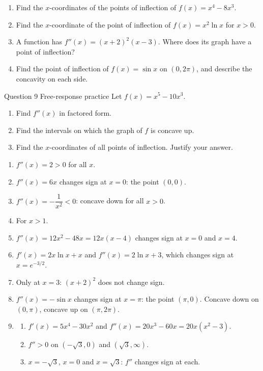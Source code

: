 \documentclass[11pt]{article}
\begin{document}
\begin{enumerate}[leftmargin=*,itemsep=2pt,start=5]
  \item Find the $x$-coordinates of the points of inflection of $f(x)=x^4-8x^3$.\work{2.8cm}
  \item Find the $x$-coordinate of the point of inflection of $f(x)=x^2\ln x$ for $x>0$.\work{2.8cm}
  \item A function has $f''(x)=(x+2)^2(x-3)$. Where does its graph have a point of inflection?\work{2.8cm}
  \item Find the point of inflection of $f(x)=\sin x$ on $(0,2\pi)$, and describe the concavity on each side.\work{2.8cm}
\end{enumerate}

\begin{frbox}{Question 9 \textperiodcentered{} Free-response practice}
Let $f(x)=x^5-10x^3$.
\begin{enumerate}[label=(\alph*),leftmargin=*,itemsep=2pt]
  \item Find $f''(x)$ in factored form.\work{2.6cm}
  \item Find the intervals on which the graph of $f$ is concave up.\work{2.6cm}
  \item Find the $x$-coordinates of all points of inflection. Justify your answer.\work{2.6cm}
\end{enumerate}
\end{frbox}

\newpage
\begin{solbox}
\begin{enumerate}[leftmargin=*,itemsep=4pt]
  \item $f''(x)=2>0$ for all $x$.
  \item $f''(x)=6x$ changes sign at $x=0$: the point $(0,0)$.
  \item $f''(x)=-\dfrac{1}{x^2}<0$: concave down for all $x>0$.
  \item For $x>1$.
  \item $f''(x)=12x^2-48x=12x(x-4)$ changes sign at $x=0$ and $x=4$.
  \item $f'(x)=2x\ln x+x$ and $f''(x)=2\ln x+3$, which changes sign at $x=e^{-3/2}$.
  \item Only at $x=3$: $(x+2)^2$ does not change sign.
  \item $f''(x)=-\sin x$ changes sign at $x=\pi$: the point $(\pi,0)$. Concave down on $(0,\pi)$, concave up on $(\pi,2\pi)$.
  \item \begin{enumerate}[label=(\alph*),leftmargin=*,itemsep=3pt]
    \item $f'(x)=5x^4-30x^2$ and $f''(x)=20x^3-60x=20x\left(x^2-3\right)$.
    \item $f''>0$ on $\left(-\sqrt3,0\right)$ and $\left(\sqrt3,\infty\right)$.
    \item $x=-\sqrt3$, $x=0$ and $x=\sqrt3$: $f''$ changes sign at each.
  \end{enumerate}
\end{enumerate}
\end{solbox}
\end{document}
